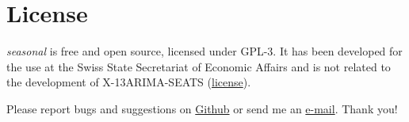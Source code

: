 \section{License}\label{license}

\emph{seasonal} is free and open source, licensed under GPL-3. It has
been developed for the use at the Swiss State Secretariat of Economic
Affairs and is not related to the development of X-13ARIMA-SEATS
(\href{https://www.census.gov/srd/www/disclaimer.html}{license}).

Please report bugs and suggestions on
\href{https://github.com/christophsax/seasonal}{Github} or send me an
\href{mailto:christoph.sax@gmail.com}{e-mail}. Thank you!
